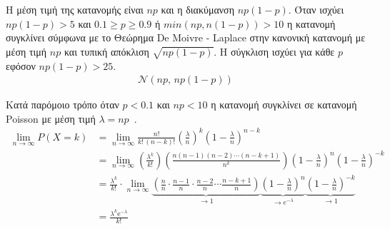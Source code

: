 \documentclass[12pt]{report}
\begin{document}
Η μέση τιμή της κατανομής είναι \(np\) και η διακύμανση \(np(1-p)\). Όταν ισχύει \(np(1-p)>5\) και \(0.1 \geq p \geq 0.9\) ή \(min(np,n(1-p))>10\) η κατανομή συγκλίνει σύμφωνα με το Θεώρημα \textlatin{De Moivre - Laplace} στην κανονική κατανομή με μέση τιμή \(np\) και τυπική απόκλιση \(\sqrt{np(1-p)}\). Η σύγκλιση ισχύει για κάθε \(p\) εφόσον \(np(1-p)>25\).
\begin{align*}
\mathcal {N}(np,\,np(1-p))
\end{align*}

Κατά παρόμοιο τρόπο όταν \(p<0.1\) και \(np<10\) η κατανομή συγκλίνει σε κατανομή \textlatin{Poisson} με μέση τιμή \(\lambda=np\)~\cite{book:07}.
\begin{align*}
\lim _{n\to \infty }P(X=k)&=\lim _{n\to \infty }{\frac {n!}{k!\,(n-k)!}}\left({\frac {\lambda }{n}}\right)^{k}\left(1-{\frac {\lambda }{n}}\right)^{n-k}\\&=\lim _{n\to \infty }\left({\frac {\lambda ^{k}}{k!}}\right)\left({\frac {n(n-1)(n-2)\cdots (n-k+1)}{n^{k}}}\right)\left(1-{\frac {\lambda }{n}}\right)^{n}\left(1-{\frac {\lambda }{n}}\right)^{-k}\\&={\frac {\lambda ^{k}}{k!}}\cdot \lim _{n\to \infty }\underbrace {\left({\frac {n}{n}}\cdot {\frac {n-1}{n}}\cdot {\frac {n-2}{n}}\cdots {\frac {n-k+1}{n}}\right)} _{\to 1}\underbrace {\left(1-{\frac {\lambda }{n}}\right)^{n}} _{\to e^{-\lambda }}\underbrace {\left(1-{\frac {\lambda }{n}}\right)^{-k}} _{\to 1}\\&={\frac {\lambda^{k} \mathrm {e} ^{-\lambda }}{k!}}
\end{align*}
\end{document}
